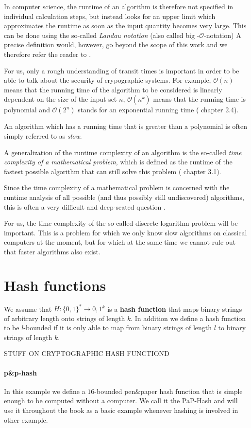 In computer science, the runtime of an algorithm is therefore not specified in individual calculation steps, but instead looks for an upper limit which approximates the runtime as soon as the input quantity becomes very large. This can be done using the so-called \textit{Landau notation} (also called big -$\mathcal{O}$-notation) A precise definition
would, however, go beyond the scope of this work and we therefore refer the reader to 
.

For us, only a rough understanding of transit times is important in order to be able to talk about the security of crypographic systems. For example, $\mathcal{O}(n)$ means that the running time of the algorithm to be considered is linearly dependent on the size of the input set $n$, $\mathcal{O}(n^k)$ means that the running time is polynomial and $\mathcal{O}(2^n) $ stands for an exponential running time (%
chapter 2.4).


An algorithm which has a running time that is greater than a polynomial is often simply referred to as \textit{slow}.

A generalization of the runtime complexity of an algorithm is the so-called \textit{time complexity of a mathematical problem}, which is defined as the runtime of the fastest possible algorithm that can still solve this problem (
chapter 3.1).

Since the time complexity of a mathematical problem is concerned with the runtime analysis of all possible (and thus possibly still undiscovered) algorithms, this is often a very difficult and deep-seated question .

For us, the time complexity of the so-called discrete logarithm problem will be important. This is a problem for which we only know slow algorithms on classical computers at the moment, but for which at the same time we cannot rule out that faster algorithms also exist.

\section{Hash functions}
We assume that $H: \{0,1\}^* \to {0,1}^k$ is a \textbf{hash function} that maps binary strings of arbitrary length onto strings of length $k$. In addition we define a hash function to be $l$-bounded if it is only able to map from binary strings of length $l$ to binary strings of length $k$. 

STUFF ON CRYPTOGRAPHIC HASH FUNCTIOND

\paragraph{p\&{}p-hash}
In this example we define a $16$-bounded pen\&{}paper hash function that is simple enough to be computed without a computer. We call it the PaP-Hash and will use it throughout the book as a basic example whenever hashing is involved in other example.

